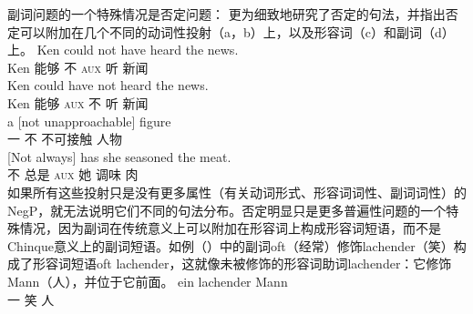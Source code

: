 副词问题的一个特殊情况是否定问题： \citet{Ernst92a}更为细致地研究了否定的句法，并指出否定可以附加在几个不同的动词性投射（a，b）上，以及形容词（c）和副词（d）上。
\eal
\ex 
\gll Ken could not have heard the news.\\
Ken 能够 不 \textsc{aux} 听  新闻\\
\ex 
\gll Ken could have not heard the news.\\
Ken 能够 \textsc{aux} 不 听  新闻\\
\ex 
\gll a [not unapproachable] figure\\
一 \spacebr{}不 不可接触 人物\\
\ex 
\gll {}[Not always] has she seasoned the meat.\\
{}\spacebr{}不 总是 \textsc{aux} 她 调味  肉\\
\zl
如果所有这些投射只是没有更多属性（有关动词形式、形容词词性、副词词性）的NegP，就无法说明它们不同的句法分布。否定明显只是更多普遍性问题的一个特殊情况，因为副词在传统意义上可以附加在形容词上构成形容词短语，而不是Chinque意义上的副词短语。如例（）中的副词oft（经常）修饰lachender（笑）构成了形容词短语oft lachender，这就像未被修饰的形容词助词lachender：它修饰Mann（人），并位于它前面。
\eal
\ex
\gll ein lachender Mann\\
     一 笑 人\\
